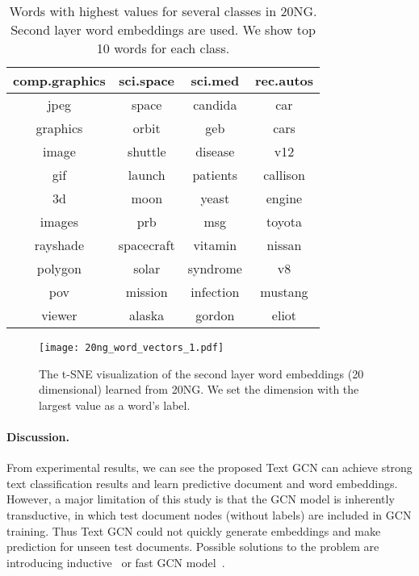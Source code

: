 \documentclass[letterpaper]{article} \usepackage{aaai19}  \usepackage{times}  \usepackage{helvet}  \usepackage{courier}  \usepackage{url}  \usepackage{graphicx}  \frenchspacing  \usepackage{amsmath}
\begin{document}
  \begin{table}[t]\footnotesize
  \centering
  \renewcommand{\arraystretch}{1.2}
  \label{table_1}
  \caption{Words with highest values for several classes in 20NG. Second layer word embeddings are used. We show top 10 words for each class.}
  \begin{tabular}{c|c|c|c}
  \hline
  
   comp.graphics & sci.space &sci.med & rec.autos \\
  \hline
  jpeg& space & candida  & car\\
  
  graphics & orbit & geb & cars\\
  
  image  &  shuttle & disease & v12\\
  
  gif  & launch & patients & callison\\
  
  3d &  moon & yeast & engine\\
  
  images &  prb & msg & toyota\\
 
  rayshade &  spacecraft & vitamin & nissan \\
  
  polygon & solar & syndrome & v8 \\
  
  pov & mission & infection & mustang\\
  
  viewer & alaska & gordon & eliot \\
  \hline
  \end{tabular}
  \end{table}

\begin{figure}[t]
\centering
\texttt{[image: 20ng\_word\_vectors\_1.pdf]}
\caption{The t-SNE visualization of the second layer word embeddings (20 dimensional) learned from 20NG. We set the dimension with the largest value as a word's label.}
\label{fig:word2vec}
\end{figure}


\paragraph{Discussion.}
From experimental results, we can see the proposed Text GCN can achieve strong text classification results and learn predictive document and word embeddings. However, a major limitation of this study is that the GCN model is inherently transductive, in which test document nodes (without labels) are included in GCN training. Thus Text GCN could not quickly generate embeddings and make prediction for unseen test documents. Possible solutions to the problem are introducing inductive~\cite{hamilton2017inductive} or fast GCN model~\cite{chen2018fastgcn}.
\end{document}
